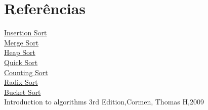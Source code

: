 \documentclass[12pt,a4paper,twoside]{report}
\begin{document}
\chapter{Referências}
\href{https://pt.wikipedia.org/wiki/Insertion_sort}{Insertion Sort}\\
\href{https://pt.wikipedia.org/wiki/Merge_sort}{Merge Sort}\\
\href{https://pt.wikipedia.org/wiki/Heapsort}{Heap Sort}\\
\href{https://en.wikipedia.org/wiki/Quicksort}{Quick Sort}\\
\href{https://pt.wikipedia.org/wiki/Counting_sort}{Counting Sort}\\
\href{https://en.wikipedia.org/wiki/Radix_sort}{Radix Sort}\\
\href{https://en.wikipedia.org/wiki/Bucket_sort}{Bucket Sort}\\
Introduction to algorithms 3rd Edition,Cormen, Thomas H,2009
  
\end{document}
